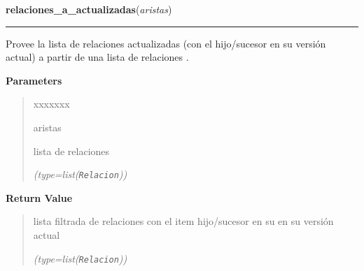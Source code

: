 \hspace{.8\funcindent}\begin{boxedminipage}{\funcwidth}

    \raggedright \textbf{relaciones\_a\_actualizadas}(\textit{aristas})

    \vspace{-1.5ex}

    \rule{\textwidth}{0.5\fboxrule}
\setlength{\parskip}{2ex}
    Provee la lista de relaciones actualizadas (con el hijo/sucesor en su 
    versión actual) a partir de una lista de relaciones .

\setlength{\parskip}{1ex}
      \textbf{Parameters}
      \vspace{-1ex}

      \begin{quote}
        \begin{Ventry}{xxxxxxx}

          \item[aristas]

          lista de relaciones

            {\it (type=list(\texttt{Relacion}))}

        \end{Ventry}

      \end{quote}

      \textbf{Return Value}
    \vspace{-1ex}

      \begin{quote}
      lista filtrada de relaciones con el item hijo/sucesor en su en su 
      versión actual

      {\it (type=list(\texttt{Relacion}))}

      \end{quote}

    \end{boxedminipage}

    \label{saip:lib:func:relaciones_b_actualizadas}

    \vspace{0.5ex}

